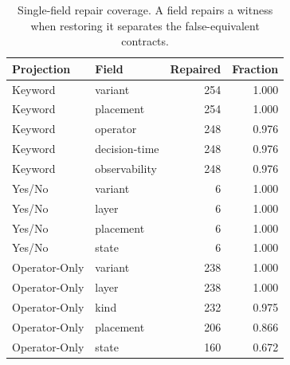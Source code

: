 \begin{table}[H]
\centering
\caption{Single-field repair coverage. A field repairs a witness when restoring it separates the false-equivalent contracts.}
\label{tab:repair-field-coverage}
\small
\begin{tabular}{llrr}
\toprule
Projection & Field & Repaired & Fraction \\
\midrule
Keyword & variant & 254 & 1.000 \\
Keyword & placement & 254 & 1.000 \\
Keyword & operator & 248 & 0.976 \\
Keyword & decision-time & 248 & 0.976 \\
Keyword & observability & 248 & 0.976 \\
\midrule
Yes/No & variant & 6 & 1.000 \\
Yes/No & layer & 6 & 1.000 \\
Yes/No & placement & 6 & 1.000 \\
Yes/No & state & 6 & 1.000 \\
\midrule
Operator-Only & variant & 238 & 1.000 \\
Operator-Only & layer & 238 & 1.000 \\
Operator-Only & kind & 232 & 0.975 \\
Operator-Only & placement & 206 & 0.866 \\
Operator-Only & state & 160 & 0.672 \\
\bottomrule
\end{tabular}
\end{table}

